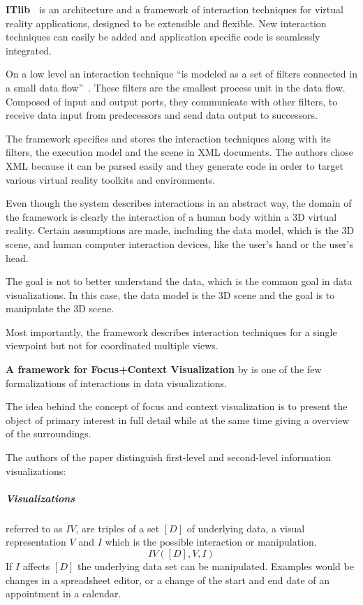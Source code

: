 \textbf{ITlib~\parencite{Figueroa2001}} is an architecture and a framework of interaction techniques for virtual reality applications, designed to be extensible and flexible.
New interaction techniques can easily be added and application specific code is seamlessly integrated.

On a low level an interaction technique ``is modeled as a set of filters connected in a small data flow''~\parencite[p.~2]{Figueroa2001}.
These filters are the smallest process unit in the data flow.
Composed of input and output ports, they communicate with other filters, to receive data input from predecessors and send data output to successors.

The framework specifies and stores the interaction techniques along with its filters, the execution model and the scene in XML documents.
The authors chose XML because it can be parsed easily and they generate code in order to target various virtual reality toolkits and environments.

Even though the system describes interactions in an abstract way, the domain of the framework is clearly the interaction of a human body within a 3D virtual reality.
Certain assumptions are made, including the data model, which is the 3D scene, and human computer interaction devices, like the user's hand or the user's head.

The goal is not to better understand the data, which is the common goal in data visualizations.
In this case, the data model is the 3D scene and the goal is to manipulate the 3D scene.

Most importantly, the framework describes interaction techniques for a single viewpoint but not for coordinated multiple views.

\textbf{A framework for Focus+Context Visualization} by \textcite{Bjork1999} is one of the few formalizations of interactions in data visualizations.

The idea behind the concept of focus and context visualization is to present the object of primary interest in full detail while at the same time giving a overview of the surroundings.

The authors of the paper distinguish first-level and second-level information visualizations:
\subparagraph{Visualizations} referred to as $IV$, are triples of a set $[D]$ of underlying data, a visual representation $V$ and $I$ which is the possible interaction or manipulation.
\begin{equation}
  IV([D], V, I)
\end{equation}
If $I$ affects $[D]$ the underlying data set can be manipulated.
Examples would be changes in a spreadsheet editor, or a change of the start and end date of an appointment in a calendar.


